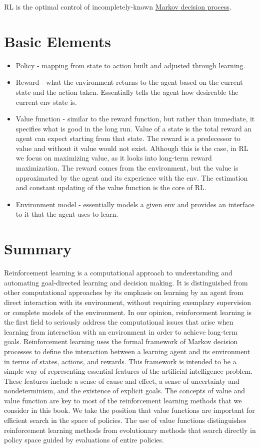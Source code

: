 RL is the optimal control of incompletely-known \hyperref[def:mdp]{Markov decision process}.

\section{Basic Elements}
\begin{itemize}
    \item{Policy} - mapping from state to action built and adjusted through learning.
    \item{Reward} - what the environment returns to the agent based on the current state and the action taken.
        Essentially tells the agent how desireable the current env state is.
    \item{Value function} - similar to the reward function, but rather than immediate, it specifies what is good in the long run.
        Value of a state is the total reward an agent can expect starting from that state.
        The reward is a predecessor to value and without it value would not exist.
        Although this is the case, in RL we focus on maximizing value, as it looks into long-term reward maximization.
        The reward comes from the environment, but the value is approximated by the agent and its experience with the env.
        The estimation and constant updating of the value function is the core of RL.
    \item{Environment model} - essentially models a given env and provides an interface to it that the agent uses to learn.
\end{itemize}

\section{Summary}
\label{sec:intro-summary}
Reinforcement learning is a computational approach to understanding and automating
goal-directed learning and decision making.
It is distinguished from other computational approaches by its emphasis on learning by an
agent from direct interaction with its environment, without requiring exemplary supervision
or complete models of the environment.
In our opinion, reinforcement learning is the first field to seriously address the
computational issues that arise when learning from interaction with an environment in
order to achieve long-term goals.
Reinforcement learning uses the formal framework of Markov decision processes to
define the interaction between a learning agent and its environment in terms of states,
actions, and rewards.
This framework is intended to be a simple way of representing essential features of the
artificial intelligence problem.
These features include a sense of cause and effect, a sense of uncertainty and nondeterminism,
and the existence of explicit goals.
The concepts of value and value function are key to most of the reinforcement learning
methods that we consider in this book.
We take the position that value functions are important for efficient search in the space
of policies.
The use of value functions distinguishes reinforcement learning methods from evolutionary
methods that search directly in policy space guided by evaluations of entire policies.
